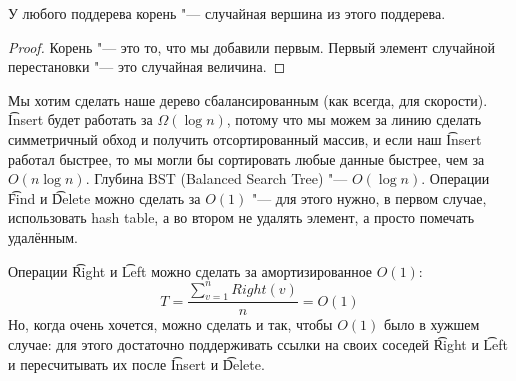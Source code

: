 \begin{lemma}
	У любого поддерева корень "--- случайная вершина из этого поддерева.
\end{lemma}
\begin{proof}
	Корень "--- это то, что мы добавили первым. Первый элемент случайной перестановки "--- это случайная величина.
\end{proof}

Мы хотим сделать наше дерево сбалансированным (как всегда, для скорости).
\t{Insert} будет работать за $\Omega(\log n)$, потому что 
мы можем за линию сделать симметричный обход и получить отсортированный массив, и 
если наш \t{Insert} работал быстрее, то мы могли бы сортировать 
любые данные быстрее, чем за $O(n \log n)$. 
Глубина BST (Balanced Search Tree) "--- $O(\log n)$. 
Операции \t{Find} и \t{Delete} можно сделать за $O(1)$ "--- для этого нужно, 
в первом случае, использовать hash table, а во втором не удалять элемент, 
а просто помечать удалённым.

Операции \t{Right} и \t{Left} можно сделать за амортизированное $O(1)$:
\[ T = \frac{\sum_{v = 1}^{n}Right(v)}{n} = O(1) \]
Но, когда очень хочется, можно сделать и так, чтобы $O(1)$ было в хужшем случае: для этого достаточно поддерживать ссылки на своих соседей \t{Right} и \t{Left} 
и пересчитывать их после \t{Insert} и \t{Delete}.

